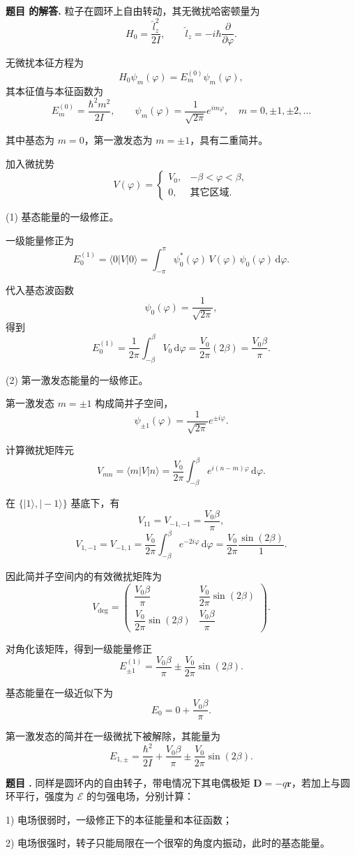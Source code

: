 \documentclass[12pt, a4paper, oneside]{ctexart}
\newcounter{problemname}
\newenvironment{problem}
  {\begin{shaded}\stepcounter{problemname}\par\noindent\textbf{题目 \theproblemname. }}
  {\end{shaded}\par}
\newenvironment{solution}
  {\par\noindent\textbf{题目 \theproblemname 的解答. }}
  {\par}
\begin{document}
\begin{solution}
  粒子在圆环上自由转动，其无微扰哈密顿量为
\[
H_0=\frac{\hat l_z^2}{2I},
\qquad
\hat l_z=-i\hbar\frac{\partial}{\partial\varphi}.
\]

无微扰本征方程为
\[
H_0\psi_m(\varphi)=E_m^{(0)}\psi_m(\varphi),
\]
其本征值与本征函数为
\[
E_m^{(0)}=\frac{\hbar^2 m^2}{2I},
\qquad
\psi_m(\varphi)=\frac{1}{\sqrt{2\pi}}e^{im\varphi},
\quad m=0,\pm1,\pm2,\dots
\]

其中基态为 $m=0$，第一激发态为 $m=\pm1$，具有二重简并。

加入微扰势
\[
V(\varphi)=
\begin{cases}
V_0, & -\beta<\varphi<\beta,\\
0, & \text{其它区域}.
\end{cases}
\]


(1) 基态能量的一级修正。

一级能量修正为
\[
E_0^{(1)}=\langle 0|V|0\rangle
=\int_{-\pi}^{\pi}\psi_0^*(\varphi)\,V(\varphi)\,\psi_0(\varphi)\,\mathrm d\varphi.
\]

代入基态波函数
\[
\psi_0(\varphi)=\frac{1}{\sqrt{2\pi}},
\]
得到
\[
E_0^{(1)}
=\frac{1}{2\pi}\int_{-\beta}^{\beta}V_0\,\mathrm d\varphi
=\frac{V_0}{2\pi}(2\beta)
=\frac{V_0\beta}{\pi}.
\]


(2) 第一激发态能量的一级修正。

第一激发态 $m=\pm1$ 构成简并子空间，
\[
\psi_{\pm1}(\varphi)=\frac{1}{\sqrt{2\pi}}e^{\pm i\varphi}.
\]

计算微扰矩阵元
\[
V_{mn}=\langle m|V|n\rangle
=\frac{V_0}{2\pi}\int_{-\beta}^{\beta}e^{i(n-m)\varphi}\,\mathrm d\varphi.
\]

在 $\{ |1\rangle, |-1\rangle \}$ 基底下，有
\[
V_{11}=V_{-1,-1}=\frac{V_0\beta}{\pi},
\]
\[
V_{1,-1}=V_{-1,1}
=\frac{V_0}{2\pi}\int_{-\beta}^{\beta}e^{-2i\varphi}\,\mathrm d\varphi
=\frac{V_0}{2\pi}\frac{\sin(2\beta)}{1}.
\]

因此简并子空间内的有效微扰矩阵为
\[
V_{\text{deg}}=
\begin{pmatrix}
\dfrac{V_0\beta}{\pi} & \dfrac{V_0}{2\pi}\sin(2\beta) \\
\dfrac{V_0}{2\pi}\sin(2\beta) & \dfrac{V_0\beta}{\pi}
\end{pmatrix}.
\]

对角化该矩阵，得到一级能量修正
\[
E_{\pm1}^{(1)}
=\frac{V_0\beta}{\pi}
\pm \frac{V_0}{2\pi}\sin(2\beta).
\]


基态能量在一级近似下为
\[
E_0 = 0 + \frac{V_0\beta}{\pi}.
\]

第一激发态的简并在一级微扰下被解除，其能量为
\[
E_{1,\pm}
=\frac{\hbar^2}{2I}
+\frac{V_0\beta}{\pi}
\pm \frac{V_0}{2\pi}\sin(2\beta).
\]

\end{solution}
\begin{problem}
同样是圆环内的自由转子，带电情况下其电偶极矩 $\mathbf{D} = -q\mathbf{r}$，若加上与圆环平行，强度为 $\mathcal{E}$ 的匀强电场，分别计算：

1) 电场很弱时，一级修正下的本征能量和本征函数；

2) 电场很强时，转子只能局限在一个很窄的角度内振动，此时的基态能量。
\end{problem}
\end{document}
